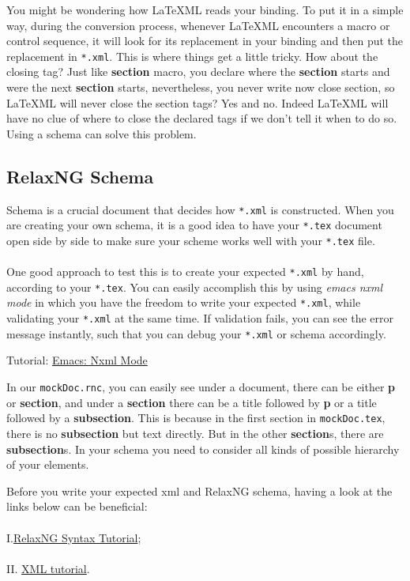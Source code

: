 \documentclass{article}
\begin{document}
\noindent You might be wondering how \LaTeX ML reads your binding. To put it in a simple way, during the conversion process, whenever \LaTeX ML encounters a macro or control sequence, it will look for its replacement in your binding and then put the replacement in \texttt{*.xml}. This is where things get a little tricky. How about the closing tag? Just like \textbf{section} macro, you declare where the \textbf{section} starts and were the next \textbf{section} starts, nevertheless, you never write now close section, so \LaTeX ML will never close the section tags? Yes and no. Indeed \LaTeX ML will have no clue of where to close the declared tags if we don't tell it when to do so. Using a schema can solve this problem.

\subsection{RelaxNG Schema}
Schema is a crucial document that decides how \texttt{*.xml} is constructed. When you are creating your own schema, it is a good idea to have your \texttt{*.tex} document open side by side to make sure your scheme works well with your \texttt{*.tex} file. \\ \\
One good approach to test this is to create your expected \texttt{*.xml} by hand, according to your \texttt{*.tex}. You can easily accomplish this by using \textit{emacs nxml mode} in which you have the freedom to write your expected \texttt{*.xml}, while validating your \texttt{*.xml} at the same time. If validation fails, you can see the error message instantly, such that you can debug your \texttt{*.xml} or schema accordingly.
\begin{tcolorbox}
Tutorial: \href{http://www.emacswiki.org/emacs/NxmlMode}{Emacs: Nxml Mode} 
\end{tcolorbox} 

\noindent In our \texttt{mockDoc.rnc}, you can easily see under a document, there can be either \textbf{p} or \textbf{section}, and under a \textbf{section} there can be a title followed by \textbf{p} or a title followed by a \textbf{subsection}. This is because in the first section in \texttt{mockDoc.tex}, there is no \textbf{subsection} but text directly. But in the other \textbf{section}s, there are \textbf{subsection}s. In your schema you need to consider all kinds of possible hierarchy of your elements.

\begin{tcolorbox}
Before you write your expected xml and RelaxNG schema, having a look at the links below can be beneficial: \\ \\
I.\href{http://relaxng.org/compact-tutorial-20030326.html}{RelaxNG Syntax Tutorial}; \\ \\
II. \href{http://www.w3schools.com/xml/}{XML tutorial}. 
\end{tcolorbox} 
\end{document}
